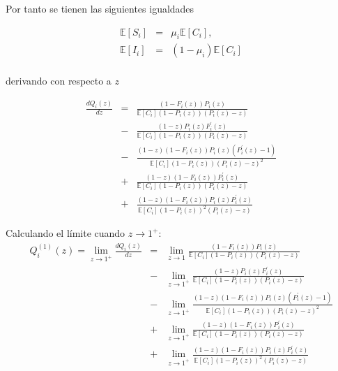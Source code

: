 \documentclass{article}
\newcommand{\esp}{\mathbb{E}}
\numberwithin{equation}{section}
\begin{document}
{Por tanto se tienen las siguientes igualdades


\begin{eqnarray*}
\esp\left[S_{i}\right]&=&\mu_{i}\esp\left[C_{i}\right],\\
\esp\left[I_{i}\right]&=&\left(1-\mu_{i}\right)\esp\left[C_{i}\right]\\
\end{eqnarray*}

derivando con respecto a $z$



\begin{eqnarray*}
\frac{d Q_{i}\left(z\right)}{d z}&=&\frac{\left(1-F_{i}\left(z\right)\right)P_{i}\left(z\right)}{\esp\left[C_{i}\right]\left(1-P_{i}\left(z\right)\right)\left(P_{i}\left(z\right)-z\right)}\\
&-&\frac{\left(1-z\right)P_{i}\left(z\right)F_{i}^{'}\left(z\right)}{\esp\left[C_{i}\right]\left(1-P_{i}\left(z\right)\right)\left(P_{i}\left(z\right)-z\right)}\\
&-&\frac{\left(1-z\right)\left(1-F_{i}\left(z\right)\right)P_{i}\left(z\right)\left(P_{i}^{'}\left(z\right)-1\right)}{\esp\left[C_{i}\right]\left(1-P_{i}\left(z\right)\right)\left(P_{i}\left(z\right)-z\right)^{2}}\\
&+&\frac{\left(1-z\right)\left(1-F_{i}\left(z\right)\right)P_{i}^{'}\left(z\right)}{\esp\left[C_{i}\right]\left(1-P_{i}\left(z\right)\right)\left(P_{i}\left(z\right)-z\right)}\\
&+&\frac{\left(1-z\right)\left(1-F_{i}\left(z\right)\right)P_{i}\left(z\right)P_{i}^{'}\left(z\right)}{\esp\left[C_{i}\right]\left(1-P_{i}\left(z\right)\right)^{2}\left(P_{i}\left(z\right)-z\right)}
\end{eqnarray*}

Calculando el l\'imite cuando $z\rightarrow1^{+}$:
\begin{eqnarray}
Q_{i}^{(1)}\left(z\right)=\lim_{z\rightarrow1^{+}}\frac{d Q_{i}\left(z\right)}{dz}&=&\lim_{z\rightarrow1}\frac{\left(1-F_{i}\left(z\right)\right)P_{i}\left(z\right)}{\esp\left[C_{i}\right]\left(1-P_{i}\left(z\right)\right)\left(P_{i}\left(z\right)-z\right)}\\
&-&\lim_{z\rightarrow1^{+}}\frac{\left(1-z\right)P_{i}\left(z\right)F_{i}^{'}\left(z\right)}{\esp\left[C_{i}\right]\left(1-P_{i}\left(z\right)\right)\left(P_{i}\left(z\right)-z\right)}\\
&-&\lim_{z\rightarrow1^{+}}\frac{\left(1-z\right)\left(1-F_{i}\left(z\right)\right)P_{i}\left(z\right)\left(P_{i}^{'}\left(z\right)-1\right)}{\esp\left[C_{i}\right]\left(1-P_{i}\left(z\right)\right)\left(P_{i}\left(z\right)-z\right)^{2}}\\
&+&\lim_{z\rightarrow1^{+}}\frac{\left(1-z\right)\left(1-F_{i}\left(z\right)\right)P_{i}^{'}\left(z\right)}{\esp\left[C_{i}\right]\left(1-P_{i}\left(z\right)\right)\left(P_{i}\left(z\right)-z\right)}\\
&+&\lim_{z\rightarrow1^{+}}\frac{\left(1-z\right)\left(1-F_{i}\left(z\right)\right)P_{i}\left(z\right)P_{i}^{'}\left(z\right)}{\esp\left[C_{i}\right]\left(1-P_{i}\left(z\right)\right)^{2}\left(P_{i}\left(z\right)-z\right)}
\end{eqnarray}

}
\end{document}
